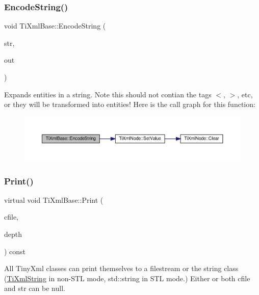 \subsubsection{\texorpdfstring{Encode\+String()}{EncodeString()}}
{\footnotesize\ttfamily void Ti\+Xml\+Base\+::\+Encode\+String (\begin{DoxyParamCaption}\item[{const T\+I\+X\+M\+L\+\_\+\+S\+T\+R\+I\+NG \&}]{str,  }\item[{T\+I\+X\+M\+L\+\_\+\+S\+T\+R\+I\+NG $\ast$}]{out }\end{DoxyParamCaption})\hspace{0.3cm}{\ttfamily [static]}}

Expands entities in a string. Note this should not contian the tag\textquotesingle{}s \textquotesingle{}$<$\textquotesingle{}, \textquotesingle{}$>$\textquotesingle{}, etc, or they will be transformed into entities! Here is the call graph for this function\+:
\nopagebreak
\begin{figure}[H]
\begin{center}
\leavevmode
\includegraphics[width=350pt]{classTiXmlBase_a32ed202562b58de64c7d799ca3c9db98_cgraph}
\end{center}
\end{figure}
\mbox{\label{classTiXmlBase_a0de56b3f2ef14c65091a3b916437b512}} 
\subsubsection{\texorpdfstring{Print()}{Print()}}
{\footnotesize\ttfamily virtual void Ti\+Xml\+Base\+::\+Print (\begin{DoxyParamCaption}\item[{F\+I\+LE $\ast$}]{cfile,  }\item[{int}]{depth }\end{DoxyParamCaption}) const\hspace{0.3cm}{\ttfamily [pure virtual]}}

All Tiny\+Xml classes can print themselves to a filestream or the string class (\hyperlink{classTiXmlString}{Ti\+Xml\+String} in non-\/\+S\+TL mode, std\+::string in S\+TL mode.) Either or both cfile and str can be null.

